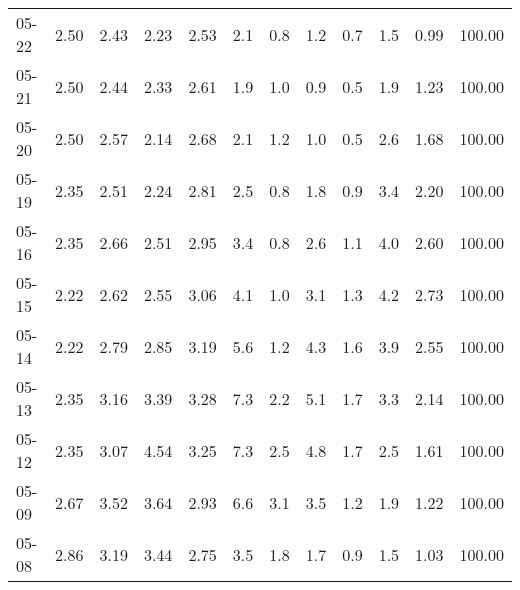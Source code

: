 \begin{threeparttable}
{\begin{tabular}{lrrrrrrrrrrr}
  05-22 &          2.50 &          2.43 &          2.23 &        2.53 &                 2.1 &                 0.8 &        1.2 &                 0.7 &              1.5 &            0.99 &                 100.00 \\
  05-21 &          2.50 &          2.44 &          2.33 &        2.61 &                 1.9 &                 1.0 &        0.9 &                 0.5 &              1.9 &            1.23 &                 100.00 \\
  05-20 &          2.50 &          2.57 &          2.14 &        2.68 &                 2.1 &                 1.2 &        1.0 &                 0.5 &              2.6 &            1.68 &                 100.00 \\
  05-19 &          2.35 &          2.51 &          2.24 &        2.81 &                 2.5 &                 0.8 &        1.8 &                 0.9 &              3.4 &            2.20 &                 100.00 \\
  05-16 &          2.35 &          2.66 &          2.51 &        2.95 &                 3.4 &                 0.8 &        2.6 &                 1.1 &              4.0 &            2.60 &                 100.00 \\
  05-15 &          2.22 &          2.62 &          2.55 &        3.06 &                 4.1 &                 1.0 &        3.1 &                 1.3 &              4.2 &            2.73 &                 100.00 \\
  05-14 &          2.22 &          2.79 &          2.85 &        3.19 &                 5.6 &                 1.2 &        4.3 &                 1.6 &              3.9 &            2.55 &                 100.00 \\
  05-13 &          2.35 &          3.16 &          3.39 &        3.28 &                 7.3 &                 2.2 &        5.1 &                 1.7 &              3.3 &            2.14 &                 100.00 \\
  05-12 &          2.35 &          3.07 &          4.54 &        3.25 &                 7.3 &                 2.5 &        4.8 &                 1.7 &              2.5 &            1.61 &                 100.00 \\
  05-09 &          2.67 &          3.52 &          3.64 &        2.93 &                 6.6 &                 3.1 &        3.5 &                 1.2 &              1.9 &            1.22 &                 100.00 \\
  05-08 &          2.86 &          3.19 &          3.44 &        2.75 &                 3.5 &                 1.8 &        1.7 &                 0.9 &              1.5 &            1.03 &                 100.00 \\

\end{tabular}}
\end{threeparttable}
